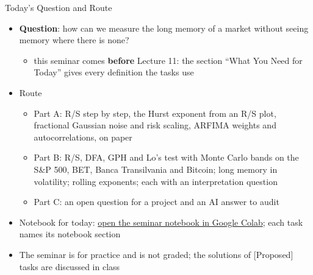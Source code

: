 \begin{frame}{Today's Question and Route}
\itemsize{\small}
\begin{itemize}
    \item \textbf{Question}: how can we measure the long memory of a market without seeing memory where there is none?
    \begin{itemize}
        \item this seminar comes \textbf{before} Lecture 11: the section ``What You Need for Today'' gives every definition the tasks use
    \end{itemize}
    \item Route
    \begin{itemize}
        \item Part A: R/S step by step, the Hurst exponent from an R/S plot, fractional Gaussian noise and risk scaling, ARFIMA weights and autocorrelations, on paper
        \item Part B: R/S, DFA, GPH and Lo's test with Monte Carlo bands on the S\&P 500, BET, Banca Transilvania and Bitcoin; long memory in volatility; rolling exponents; each with an interpretation question
        \item Part C: an open question for a project and an AI answer to audit
    \end{itemize}
    \item Notebook for today: \href{\nb}{open the seminar notebook in Google Colab}; each task names its notebook section
    \item The seminar is for practice and is not graded; the solutions of [Proposed] tasks are discussed in class
\end{itemize}
\end{frame}


